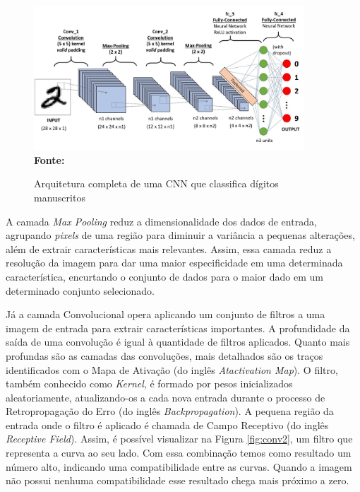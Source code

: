 \begin{figure}[ht]
 	\centering	
 	\caption[\hspace{0.1cm}Grade Computacional.]{Arquitetura completa de uma CNN que classifica dígitos manuscritos}
 	\vspace{-0.4cm}
 	\includegraphics[width=0.9\textwidth]{figuras/cnn.png}
 	\captionsetup{justification=centering}
	\vspace{-0.2cm}
     \\\textbf{\footnotesize Fonte: \cite{towardsdatascienceimage}}
	\label{fig:cnn}
\end{figure}

A camada \textit{Max Pooling} reduz a dimensionalidade dos dados de entrada, agrupando \textit{pixels} de uma região para diminuir a variância a pequenas alterações, além de extrair características mais relevantes. Assim, essa camada reduz a resolução da imagem para dar uma maior especificidade em uma determinada característica, encurtando o conjunto de dados para o maior dado em um determinado conjunto selecionado.

Já a camada Convolucional opera aplicando um conjunto de filtros a uma imagem de entrada para extrair características importantes. A profundidade da saída de uma convolução é igual à quantidade de filtros aplicados. Quanto mais profundas são as camadas das convoluções, mais detalhados são os traços identificados com o Mapa de Ativação (do inglês \textit{Atactivation Map}). O filtro, também conhecido como \textit{Kernel}, é formado por pesos inicializados aleatoriamente, atualizando-os a cada nova entrada durante o processo de Retropropagação do Erro (do inglês \textit{Backpropagation}). A pequena região da entrada onde o filtro é aplicado é chamada de Campo Receptivo (do inglês \textit{Receptive Field}). Assim, é possível visualizar na Figura \ref{fig:conv2}, um filtro que representa a curva ao seu lado. Com essa combinação temos como resultado um número alto, indicando uma compatibilidade entre as curvas. Quando a imagem não possui nenhuma compatibilidade esse resultado chega mais próximo a zero.

